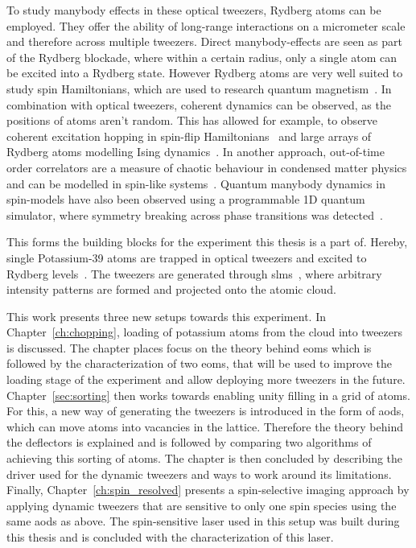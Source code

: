 To study manybody effects in these optical tweezers, Rydberg atoms can be employed. They offer the ability of long-range interactions on a micrometer scale~\cite{Urban2009} and therefore across multiple tweezers. Direct manybody-effects are seen as part of the Rydberg blockade, where within a certain radius, only a single atom can be excited into a Rydberg state. However Rydberg atoms are very well suited to study spin Hamiltonians, which are used to research quantum magnetism~\cite{Kiffner2017}. In combination with optical tweezers, coherent dynamics can be observed, as the positions of atoms aren't random. This has allowed for example, to observe coherent excitation hopping in spin-flip Hamiltonians~\cite{Barredo2015} and large arrays of Rydberg atoms modelling Ising dynamics~\cite{Labuhn2016}. In another approach, out-of-time order correlators are a measure of chaotic behaviour in condensed matter physics and can be modelled in spin-like systems~\cite{Fan2017}. Quantum manybody dynamics in spin-models have also been observed using a programmable 1D quantum simulator, where symmetry breaking across phase transitions was detected~\cite{Bernien2017}.

This forms the building blocks for the experiment this thesis is a part of. Hereby, single Potassium-39 atoms are trapped in optical tweezers and excited to Rydberg levels~\cite{Hirthe2018}. The tweezers are generated through \acp{slm}~\cite{Osterholz2020}, where arbitrary intensity patterns are formed and projected onto the atomic cloud.


This work presents three new setups towards this experiment. In Chapter~\ref{ch:chopping}, loading of potassium atoms from the cloud into tweezers is discussed. The chapter places focus on the theory behind \acp{eom} which is followed by the characterization of two \acp{eom}, that will be used to improve the loading stage of the experiment and allow deploying more tweezers in the future.
Chapter~\ref{sec:sorting} then works towards enabling unity filling in a grid of atoms. For this, a new way of generating the tweezers is introduced in the form of \acp{aod}, which can move atoms into vacancies in the lattice. Therefore the theory behind the deflectors is explained and is followed by comparing two algorithms of achieving this sorting of atoms. The chapter is then concluded by describing the driver used for the dynamic tweezers and ways to work around its limitations.
Finally, Chapter~\ref{ch:spin_resolved} presents a spin-selective imaging approach by applying dynamic tweezers that are sensitive to only one spin species using the same \acp{aod} as above. The spin-sensitive laser used in this setup was built during this thesis and is concluded with the characterization of this laser.
